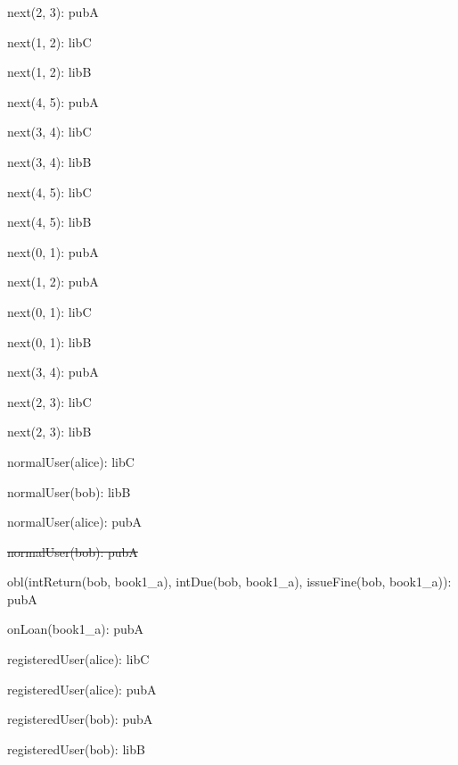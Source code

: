 \documentclass{article}
\newenvironment{states}
        {\begin{minipage}{\tableWidth}\raggedright\begin{description}[align=left,leftmargin=1em,noitemsep,labelsep=\parindent]}
        {\end{description}\end{minipage}}
\begin{document}
{\begin{states}
\item{{next(\allowbreak{}2, 3): pubA}}
\item{{next(\allowbreak{}1, 2): libC}}
\item{{next(\allowbreak{}1, 2): libB}}
\item{{next(\allowbreak{}4, 5): pubA}}
\item{{next(\allowbreak{}3, 4): libC}}
\item{{next(\allowbreak{}3, 4): libB}}
\item{{next(\allowbreak{}4, 5): libC}}
\item{{next(\allowbreak{}4, 5): libB}}
\item{{next(\allowbreak{}0, 1): pubA}}
\item{{next(\allowbreak{}1, 2): pubA}}
\item{{next(\allowbreak{}0, 1): libC}}
\item{{next(\allowbreak{}0, 1): libB}}
\item{{next(\allowbreak{}3, 4): pubA}}
\item{{next(\allowbreak{}2, 3): libC}}
\item{{next(\allowbreak{}2, 3): libB}}
\item{{normalUser(\allowbreak{}alice): libC}}
\item{{normalUser(\allowbreak{}bob): libB}}
\item{{normalUser(\allowbreak{}alice): pubA}}
\item{\sout{normalUser(\allowbreak{}bob): pubA}}
\item{{obl(\allowbreak{}intReturn(\allowbreak{}bob, book1\_a), intDue(\allowbreak{}bob, book1\_a), issueFine(\allowbreak{}bob, book1\_a)): pubA}}
\item{{onLoan(\allowbreak{}book1\_a): pubA}}
\item{{registeredUser(\allowbreak{}alice): libC}}
\item{{registeredUser(\allowbreak{}alice): pubA}}
\item{{registeredUser(\allowbreak{}bob): pubA}}
\item{{registeredUser(\allowbreak{}bob): libB}}
\end{states}}
\end{document}
